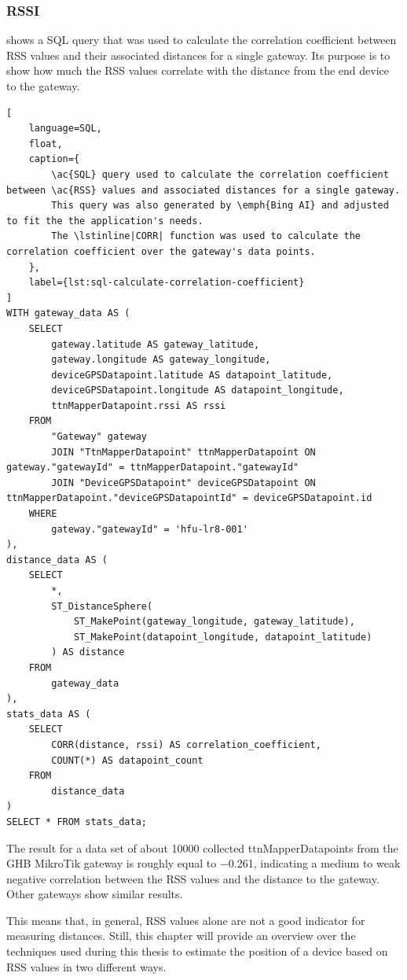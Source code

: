 \subsubsection{\acf{RSSI}}

 shows a \ac{SQL} query that was used to calculate the correlation coefficient between \ac{RSS} values and their associated distances for a single gateway.
Its purpose is to show how much the \ac{RSS} values correlate with the distance from the end device to the gateway.

\begin{lstlisting}[
    language=SQL,
    float,
    caption={
        \ac{SQL} query used to calculate the correlation coefficient between \ac{RSS} values and associated distances for a single gateway.
        This query was also generated by \emph{Bing AI} and adjusted to fit the the application's needs.
        The \lstinline|CORR| function was used to calculate the correlation coefficient over the gateway's data points.
    },
    label={lst:sql-calculate-correlation-coefficient}
]
WITH gateway_data AS (
    SELECT
        gateway.latitude AS gateway_latitude,
        gateway.longitude AS gateway_longitude,
        deviceGPSDatapoint.latitude AS datapoint_latitude,
        deviceGPSDatapoint.longitude AS datapoint_longitude,
        ttnMapperDatapoint.rssi AS rssi
    FROM
        "Gateway" gateway
        JOIN "TtnMapperDatapoint" ttnMapperDatapoint ON gateway."gatewayId" = ttnMapperDatapoint."gatewayId"
        JOIN "DeviceGPSDatapoint" deviceGPSDatapoint ON ttnMapperDatapoint."deviceGPSDatapointId" = deviceGPSDatapoint.id
    WHERE
        gateway."gatewayId" = 'hfu-lr8-001'
),
distance_data AS (
    SELECT
        *,
        ST_DistanceSphere(
            ST_MakePoint(gateway_longitude, gateway_latitude),
            ST_MakePoint(datapoint_longitude, datapoint_latitude)
        ) AS distance
    FROM
        gateway_data
),
stats_data AS (
    SELECT
        CORR(distance, rssi) AS correlation_coefficient,
		COUNT(*) AS datapoint_count
    FROM
        distance_data
)
SELECT * FROM stats_data;
\end{lstlisting}

The result for a data set of about \num{10000} collected ttnMapperDatapoints from the \ac{GHB} MikroTik gateway is roughly equal to \num{-0.261}, indicating a medium to weak negative correlation between the \ac{RSS} values and the distance to the gateway.
Other gateways show similar results.

This means that, in general, \ac{RSS} values alone are not a good indicator for measuring distances.
Still, this chapter will provide an overview over the techniques used during this thesis to estimate the position of a device based on \ac{RSS} values in two different ways.

